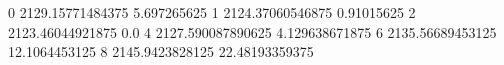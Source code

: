 0 2129.15771484375 5.697265625
1 2124.37060546875 0.91015625
2 2123.46044921875 0.0
4 2127.590087890625 4.129638671875
6 2135.56689453125 12.1064453125
8 2145.9423828125 22.48193359375
